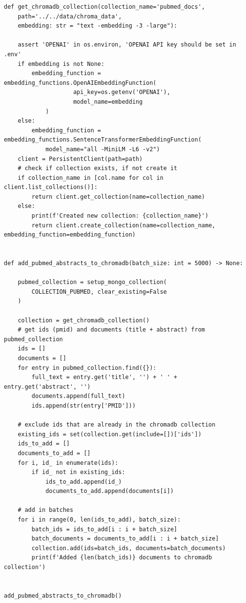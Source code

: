 \begin{lstlisting}[style=Python]
def get_chromadb_collection(collection_name='pubmed_docs', 
    path='../../data/chroma_data',
    embedding: str = "text -embedding -3 -large"):

    assert 'OPENAI' in os.environ, 'OPENAI API key should be set in .env'
    if embedding is not None:
        embedding_function = embedding_functions.OpenAIEmbeddingFunction(
                    api_key=os.getenv('OPENAI'),
                    model_name=embedding
            )
    else:
        embedding_function = embedding_functions.SentenceTransformerEmbeddingFunction(
            model_name="all -MiniLM -L6 -v2")
    client = PersistentClient(path=path)
    # check if collection exists, if not create it
    if collection_name in [col.name for col in client.list_collections()]:
        return client.get_collection(name=collection_name)
    else:
        print(f'Created new collection: {collection_name}')
        return client.create_collection(name=collection_name, embedding_function=embedding_function)


def add_pubmed_abstracts_to_chromadb(batch_size: int = 5000) -> None:

    pubmed_collection = setup_mongo_collection(
        COLLECTION_PUBMED, clear_existing=False
    )

    collection = get_chromadb_collection()
    # get ids (pmid) and documents (title + abstract) from pubmed_collection
    ids = []
    documents = []
    for entry in pubmed_collection.find({}):
        full_text = entry.get('title', '') + ' ' + entry.get('abstract', '')
        documents.append(full_text)
        ids.append(str(entry['PMID']))

    # exclude ids that are already in the chromadb collection
    existing_ids = set(collection.get(include=[])['ids'])
    ids_to_add = []
    documents_to_add = []
    for i, id_ in enumerate(ids):
        if id_ not in existing_ids:
            ids_to_add.append(id_)
            documents_to_add.append(documents[i])

    # add in batches
    for i in range(0, len(ids_to_add), batch_size):
        batch_ids = ids_to_add[i : i + batch_size]
        batch_documents = documents_to_add[i : i + batch_size]
        collection.add(ids=batch_ids, documents=batch_documents)
        print(f'Added {len(batch_ids)} documents to chromadb collection')


add_pubmed_abstracts_to_chromadb()
\end{lstlisting}

